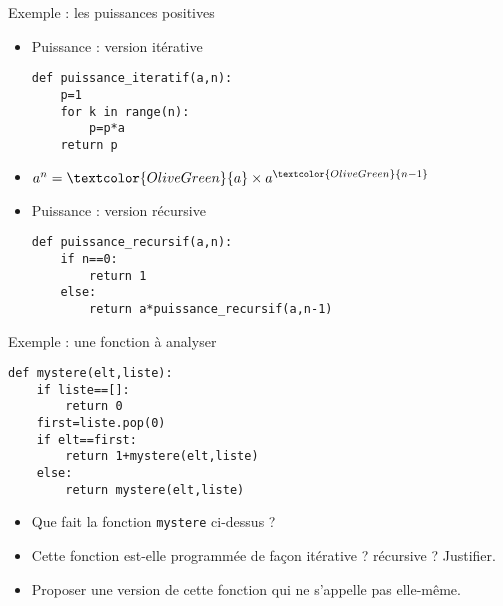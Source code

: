 \documentclass[10pt]{beamer}
\begin{document}
\begin{frame}[fragile]
	\mframe{\Recursivite}
	\begin{exampleblock}{Exemple : les puissances positives}
		\begin{itemize}
			\item<1-> \textcolor{OliveGreen}{Puissance : version itérative}
			      \begin{lstlisting}
def puissance_iteratif(a,n):
    p=1
    for k in range(n):
        p=p*a
    return p
\end{lstlisting}
			\item<2-> $a^n = \textcolor{OliveGreen}{a} \times a^{\textcolor{OliveGreen}{n-1}}$
			\item<3-> \textcolor{OliveGreen}{Puissance : version récursive}
			      \begin{lstlisting}
def puissance_recursif(a,n):
    if n==0:
        return 1
    else:
        return a*puissance_recursif(a,n-1)
\end{lstlisting}
		\end{itemize}
	\end{exampleblock}
\end{frame}


\begin{frame}[fragile]
	\mframe{\Recursivite}
	\begin{exampleblock}{Exemple : une fonction à analyser}
		\begin{lstlisting}
def mystere(elt,liste):
    if liste==[]:
        return 0
    first=liste.pop(0)
    if elt==first:
        return 1+mystere(elt,liste)
    else:
        return mystere(elt,liste)
\end{lstlisting}
		\begin{itemize}
			\item<2-> Que fait la fonction {\tt mystere} ci-dessus ?
			\item<3-> Cette fonction est-elle programmée de façon itérative ? récursive ? Justifier.
			\item<4-> Proposer une version de cette fonction qui ne s'appelle pas elle-même.
		\end{itemize}
	\end{exampleblock}
\end{frame}
\end{document}
